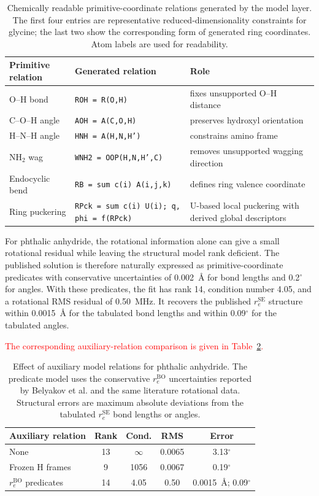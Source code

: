 \documentclass[aip,jcp,reprint,longbibliography,floatfix]{revtex4-2}
\newcommand{\rev}[1]{\textcolor{red}{#1}}
\begin{document}
\begin{table}[t]
\caption{Chemically readable primitive-coordinate relations generated by the
model layer. The first four entries are representative reduced-dimensionality
constraints for glycine; the last two show the corresponding form of generated
ring coordinates. Atom labels are used for readability.}
\label{tab:generated-relation-example}
\scriptsize
\setlength{\tabcolsep}{4pt}
\begin{tabular}{@{}lll@{}}
\toprule
Primitive relation & Generated relation & Role \\
\midrule
O--H bond & \texttt{ROH = R(O,H)} & fixes unsupported O--H distance \\
C--O--H angle & \texttt{AOH = A(C,O,H)} & preserves hydroxyl orientation \\
H--N--H angle & \texttt{HNH = A(H,N,H')} & constrains amino frame \\
NH$_2$ wag & \texttt{WNH2 = OOP(H,N,H',C)} & removes unsupported wagging direction \\
Endocyclic bend & \texttt{RB = sum c(i) A(i,j,k)} & defines ring valence coordinate \\
Ring puckering & \texttt{RPck = sum c(i) U(i); q, phi = f(RPck)} & U-based local puckering with derived global descriptors \\
\bottomrule
\end{tabular}
\end{table}

For phthalic anhydride, the rotational information alone can give a small
rotational residual while leaving the structural model rank deficient. The
published solution is therefore naturally expressed as primitive-coordinate
predicates with conservative uncertainties of 0.002~\AA{} for bond lengths and
0.2$^\circ$ for angles. With these predicates, the fit has
rank 14, condition number 4.05, and a rotational RMS residual of 0.50~MHz. It
recovers the published $r_e^\mathrm{SE}$ structure within 0.0015~\AA{} for the
tabulated bond lengths and within 0.09$^\circ$ for the tabulated angles.

\rev{The corresponding auxiliary-relation comparison is given in
Table~\ref{tab:phthalic-predicates}.}

\begin{table}[t]
\caption{Effect of auxiliary model relations for phthalic anhydride. The
predicate model uses the conservative $r_e^\mathrm{BO}$ uncertainties reported
by Belyakov et al. and the same literature rotational data. Structural errors are
maximum absolute deviations from the tabulated $r_e^\mathrm{SE}$ bond lengths or angles.}
\label{tab:phthalic-predicates}
\scriptsize
\setlength{\tabcolsep}{2.5pt}
\begin{tabular}{lcccc}
\toprule
Auxiliary relation & Rank & Cond. & RMS & Error \\
\midrule
None & 13 & $\infty$ & 0.0065 & 3.13$^\circ$ \\
Frozen H frames & 9 & 1056 & 0.0067 & 0.19$^\circ$ \\
$r_e^\mathrm{BO}$ predicates & 14 & 4.05 & 0.50 & 0.0015~\AA; 0.09$^\circ$ \\
\bottomrule
\end{tabular}
\end{table}
\end{document}

